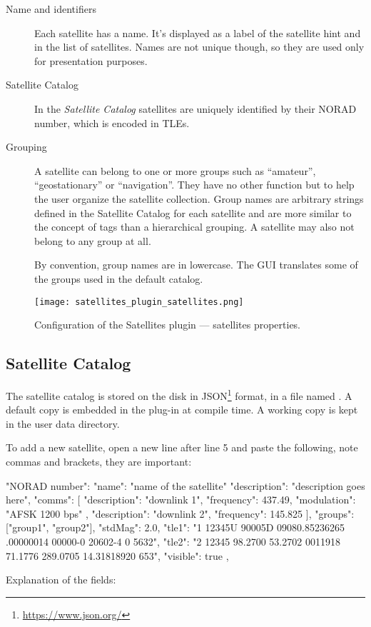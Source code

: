 \begin{description}
\item[Name and identifiers] Each satellite has a name. It's displayed as a label of the satellite hint and in the list of satellites. Names are not unique though, so they are used only
for presentation purposes.

\item[Satellite Catalog] In the \emph{Satellite Catalog} satellites are uniquely identified by their NORAD number, which is encoded in TLEs.

\item[Grouping]
A satellite can belong to one or more groups such as ``amateur'',
``geostationary'' or ``navigation''. They have no other function but
to help the user organize the satellite collection.  Group names are
arbitrary strings defined in the Satellite Catalog for each satellite
and are more similar to the concept of tags than a hierarchical
grouping. A satellite may also not belong to any group at all.

By convention, group names are in lowercase. The GUI translates some of the groups used in the default catalog.
\end{description}

\begin{figure}[tbp]
	\centering\texttt{[image: satellites\_plugin\_satellites.png]}
	\caption{Configuration of the Satellites plugin --- satellites properties.}
	\label{fig:plugins:Satellites:Configuration:Satellites}
\end{figure}


\subsection{Satellite Catalog}
\label{sec:plugins:Satellites:catalog}

The satellite catalog is stored on the disk in JSON\footnote{\url{https://www.json.org/}}
format, in a file named . A default copy is embedded in the plug-in at compile time. A working copy is kept in the user data directory.


To add a new satellite, open a new line after line 5 and paste the following, note commas and brackets, they are important:
\begin{configfileScr}
"NORAD number": 
{
  "name": "name of the satellite"
  "description": "description goes here",
  "comms": [
     {
  	"description": "downlink 1",
  	"frequency": 437.49,
  	"modulation": "AFSK 1200 bps"
     },
     {
  	"description": "downlink 2",
  	"frequency": 145.825
     }
  ],
  "groups": ["group1", "group2"],
  "stdMag": 2.0,
  "tle1": "1 12345U 90005D   09080.85236265  .00000014  00000-0  20602-4 0  5632",
  "tle2": "2 12345 98.2700  53.2702 0011918  71.1776 289.0705 14.31818920   653",
  "visible": true
},
\end{configfileScr}
Explanation of the fields:

